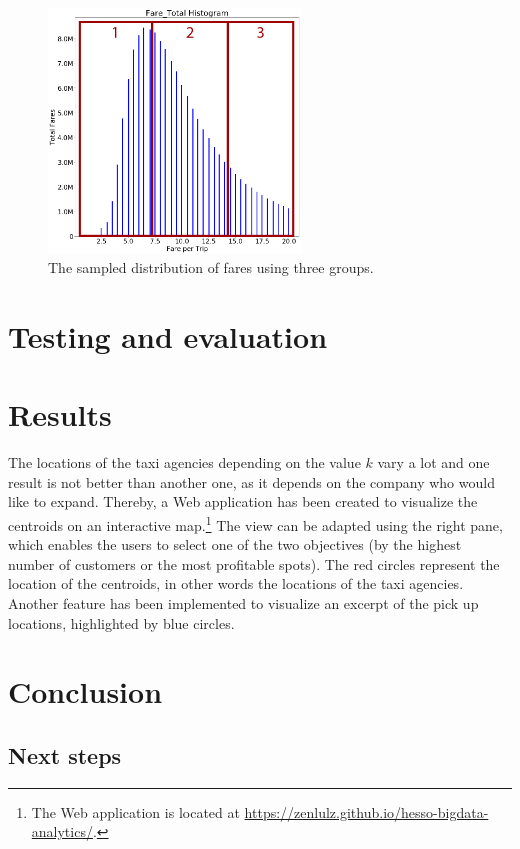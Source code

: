 \documentclass[a4paper]{article}
\begin{document}
\begin{figure}
  \centering
  \includegraphics[width=0.6\textwidth]{images/distribution-fares-sampled.png}
  \caption{The sampled distribution of fares using three groups.}
  \label{fig:distribution-fares-sampled}
\end{figure}


\section{Testing and evaluation}

\section{Results}
The locations of the taxi agencies depending on the value $k$ vary a lot and one result is not better than another one, as it depends on the company who would like to expand. Thereby, a Web application has been created to visualize the centroids on an interactive map.\footnote{The Web application is located at \url{https://zenlulz.github.io/hesso-bigdata-analytics/}.} The view can be adapted using the right pane, which enables the users to select one of the two objectives (by the highest number of customers or the most profitable spots). The red circles represent the location of the centroids, in other words the locations of the taxi agencies. Another feature has been implemented to visualize an excerpt of the pick up locations, highlighted by blue circles.

\section{Conclusion}
\subsection{Next steps}
\end{document}
